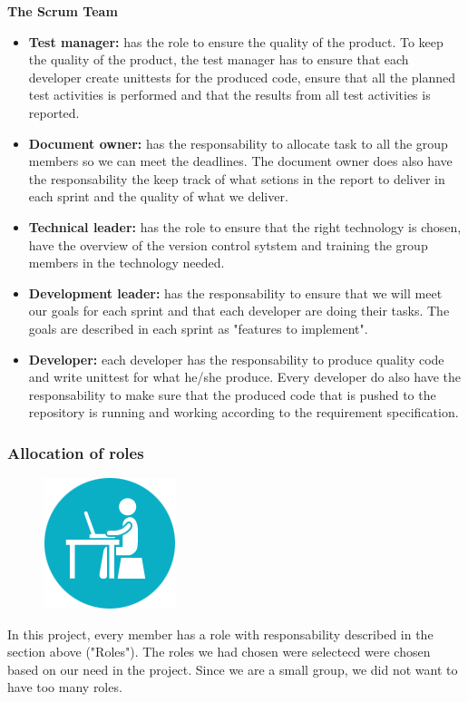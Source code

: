 \noindent
{\bf The Scrum Team}
\begin{itemize}

  \item {\bf Test manager:} has the role to ensure the quality of the product. To keep the quality 
  of the product, the test manager has to ensure that each developer create unittests for the 
  produced code, ensure that all the planned test activities is performed and that the results 
  from all test activities is reported.

  \item {\bf Document owner:} has the responsability to allocate task to all the group members so we can meet the deadlines. The document owner does also have the responsability the keep track of what setions in the report to deliver in each sprint and the quality of what we deliver.

  \item {\bf Technical leader:} has the role to ensure that the right technology is
  chosen, have the overview of the version control sytstem and training the group members
  in the technology needed.

  \item {\bf Development leader:} has the responsability to ensure that we will meet our goals
  for each sprint and that each developer are doing their tasks. The goals are described in each 
  sprint as "features to implement". 

  \item {\bf Developer:} each developer has the responsability to produce quality code
  and write unittest for what he/she produce. Every developer do also have the responsability
  to make sure that the produced code that is pushed to the repository is running and working
  according to the requirement specification.
  \end{itemize} 

\subsubsection{Allocation of roles}
\begin{figure}
  \begin{center}
  \includegraphics[scale=0.7]{pictures/Work.png}
  \end{center}
\end{figure}
In this project, every member has a role with responsability described in the section above ("Roles").
The roles we had chosen were selectecd were chosen based on our need in the project. 
Since we are a small group, we did not want to have too many roles.

